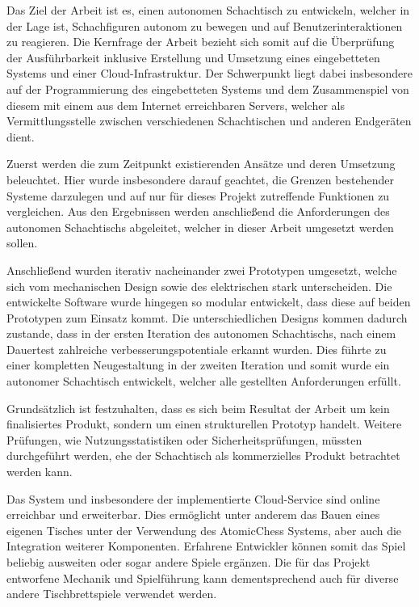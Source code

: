 Das Ziel der Arbeit ist es, einen autonomen Schachtisch zu entwickeln,
welcher in der Lage ist, Schachfiguren autonom zu bewegen und auf
Benutzerinteraktionen zu reagieren. Die Kernfrage der Arbeit bezieht
sich somit auf die Überprüfung der Ausführbarkeit inklusive Erstellung
und Umsetzung eines eingebetteten Systems und einer Cloud-Infrastruktur.
Der Schwerpunkt liegt dabei insbesondere auf der Programmierung des
eingebetteten Systems und dem Zusammenspiel von diesem mit einem aus dem
Internet erreichbaren Servers, welcher als Vermittlungsstelle zwischen
verschiedenen Schachtischen und anderen Endgeräten dient.

Zuerst werden die zum Zeitpunkt existierenden Ansätze und deren
Umsetzung beleuchtet. Hier wurde insbesondere darauf geachtet, die
Grenzen bestehender Systeme darzulegen und auf nur für dieses Projekt
zutreffende Funktionen zu vergleichen. Aus den Ergebnissen werden
anschließend die Anforderungen des autonomen Schachtischs abgeleitet,
welcher in dieser Arbeit umgesetzt werden sollen.

Anschließend wurden iterativ nacheinander zwei Prototypen umgesetzt,
welche sich vom mechanischen Design sowie des elektrischen stark
unterscheiden. Die entwickelte Software wurde hingegen so modular
entwickelt, dass diese auf beiden Prototypen zum Einsatz kommt. Die
unterschiedlichen Designs kommen dadurch zustande, dass in der ersten
Iteration des autonomen Schachtischs, nach einem Dauertest zahlreiche
verbesserungspotentiale erkannt wurden. Dies führte zu einer kompletten
Neugestaltung in der zweiten Iteration und somit wurde ein autonomer
Schachtisch entwickelt, welcher alle gestellten Anforderungen erfüllt.

Grundsätzlich ist festzuhalten, dass es sich beim Resultat der Arbeit um
kein finalisiertes Produkt, sondern um einen strukturellen Prototyp
handelt. Weitere Prüfungen, wie Nutzungsstatistiken oder
Sicherheitsprüfungen, müssten durchgeführt werden, ehe der Schachtisch
als kommerzielles Produkt betrachtet werden kann.

Das System und insbesondere der implementierte Cloud-Service sind online
erreichbar und erweiterbar. Dies ermöglicht unter anderem das Bauen
eines eigenen Tisches unter der Verwendung des AtomicChess Systems, aber
auch die Integration weiterer Komponenten. Erfahrene Entwickler können
somit das Spiel beliebig ausweiten oder sogar andere Spiele ergänzen.
Die für das Projekt entworfene Mechanik und Spielführung kann
dementsprechend auch für diverse andere Tischbrettspiele verwendet
werden.
